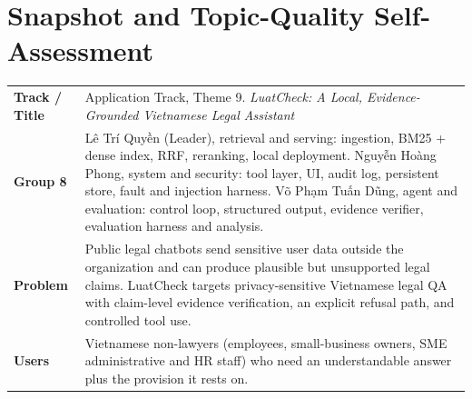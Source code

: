 
\newcommand{\TODO}[1]{\textbf{[[#1]]}}
\newcommand{\hdr}[1]{\vspace{2pt}\noindent\textbf{#1}}

\section{Snapshot and Topic-Quality Self-Assessment}

{\small
\noindent
\begin{tabularx}{\textwidth}{@{} >{\raggedright\arraybackslash}p{2.3cm} X @{}}
\toprule
\textbf{Track / Title} & Application Track, Theme 9. \textit{LuatCheck: A Local, Evidence-Grounded Vietnamese Legal Assistant} \\
\textbf{Group 8} &
Lê Trí Quyền (Leader), retrieval and serving: ingestion, BM25 + dense index, RRF, reranking, local deployment.
Nguyễn Hoàng Phong, system and security: tool layer, UI, audit log, persistent store, fault and injection harness.
Võ Phạm Tuấn Dũng, agent and evaluation: control loop, structured output, evidence verifier, evaluation harness and analysis. \\
\textbf{Problem} & Public legal chatbots send sensitive user data outside the organization and can produce plausible but unsupported legal claims. LuatCheck targets privacy-sensitive Vietnamese legal QA with claim-level evidence verification, an explicit refusal path, and controlled tool use. \\
\textbf{Users} & Vietnamese non-lawyers (employees, small-business owners, SME administrative and HR staff) who need an understandable answer plus the provision it rests on. \\
\bottomrule
\end{tabularx}
}

